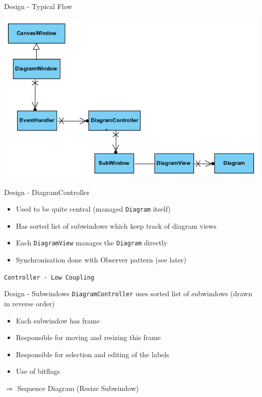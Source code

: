 \documentclass[10pt]{beamer}
\begin{document}
\begin{frame}[fragile]{Design - Typical Flow}
\begin{center}
\includegraphics[width=1\textwidth]{flow}
\end{center}
\end{frame}

\begin{frame}[fragile]{Design - DiagramController}
\begin{itemize}
\item Used to be quite central (managed \texttt{Diagram} itself)
\item Has sorted list of subwindows which keep track of diagram views
\item Each \texttt{DiagramView} manages the \texttt{Diagram} directly
\item Synchronisation done with Observer pattern (see later)
\end{itemize}
\begin{center}
\vspace{1cm}
\texttt{Controller - Low Coupling}
\end{center}
\end{frame}

\begin{frame}[fragile]{Design - Subwindows}
\texttt{DiagramController} uses sorted list of subwindows (drawn in reverse order)
\begin{itemize}
\item Each subwindow has frame
\item Responsible for moving and resizing this frame
\item Responsible for selection and editing of the labels
\item Use of bitflags
\end{itemize}
$\Rightarrow$ Sequence Diagram (Resize Subwindow) 
\begin{center}
\vspace{1cm}
\end{center}
\end{frame}
\end{document}
